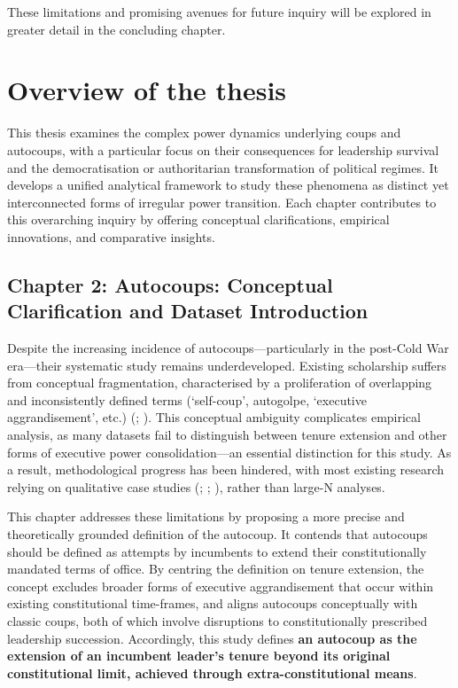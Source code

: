 \documentclass[
  12pt,
]{report}
\begin{document}
These limitations and promising avenues for future inquiry will be
explored in greater detail in the concluding chapter.

\section{Overview of the thesis}\label{overview-of-the-thesis}

This thesis examines the complex power dynamics underlying coups and
autocoups, with a particular focus on their consequences for leadership
survival and the democratisation or authoritarian transformation of
political regimes. It develops a unified analytical framework to study
these phenomena as distinct yet interconnected forms of irregular power
transition. Each chapter contributes to this overarching inquiry by
offering conceptual clarifications, empirical innovations, and
comparative insights.

\subsection*{Chapter 2: Autocoups: Conceptual Clarification and Dataset
Introduction}\label{chapter-2-autocoups-conceptual-clarification-and-dataset-introduction}

Despite the increasing incidence of autocoups---particularly in the
post-Cold War era---their systematic study remains underdeveloped.
Existing scholarship suffers from conceptual fragmentation,
characterised by a proliferation of overlapping and inconsistently
defined terms (`self-coup', autogolpe, `executive aggrandisement', etc.)
(;
). This conceptual
ambiguity complicates empirical analysis, as many datasets fail to
distinguish between tenure extension and other forms of executive power
consolidation---an essential distinction for this study. As a result,
methodological progress has been hindered, with most existing research
relying on qualitative case studies (; ;
),
rather than large-N analyses.

This chapter addresses these limitations by proposing a more precise and
theoretically grounded definition of the autocoup. It contends that
autocoups should be defined as attempts by incumbents to extend their
constitutionally mandated terms of office. By centring the definition on
tenure extension, the concept excludes broader forms of executive
aggrandisement that occur within existing constitutional time-frames,
and aligns autocoups conceptually with classic coups, both of which
involve disruptions to constitutionally prescribed leadership
succession. Accordingly, this study defines \textbf{an autocoup as the
extension of an incumbent leader's tenure beyond its original
constitutional limit, achieved through extra-constitutional means}.
\end{document}
